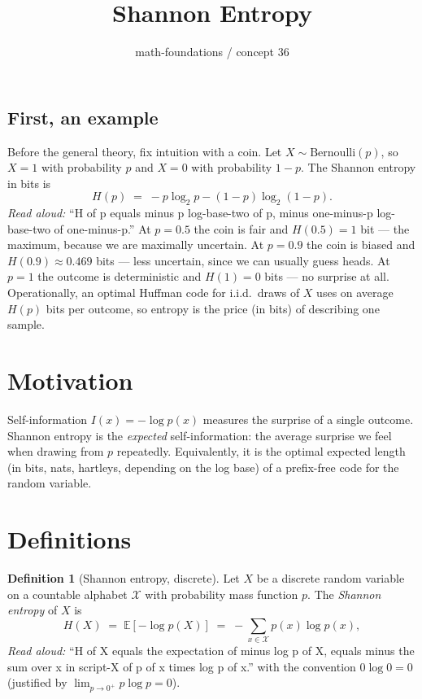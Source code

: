 \documentclass[11pt]{article}
\title{Shannon Entropy}
\author{math-foundations / concept 36}
\date{}
\theoremstyle{definition}
\newtheorem{definition}[theorem]{Definition}
\begin{document}
\maketitle

\subsection*{First, an example}
Before the general theory, fix intuition with a coin. Let $X \sim \mathrm{Bernoulli}(p)$,
so $X = 1$ with probability $p$ and $X = 0$ with probability $1-p$. The Shannon
entropy in bits is
\[
H(p) \;=\; -p \log_2 p - (1-p) \log_2 (1-p).
\]
\emph{Read aloud:} ``H of p equals minus p log-base-two of p, minus one-minus-p log-base-two of one-minus-p.''
At $p = 0.5$ the coin is fair and $H(0.5) = 1$ bit --- the maximum, because we are
maximally uncertain. At $p = 0.9$ the coin is biased and $H(0.9) \approx 0.469$ bits
--- less uncertain, since we can usually guess heads. At $p = 1$ the outcome is
deterministic and $H(1) = 0$ bits --- no surprise at all. Operationally, an optimal
Huffman code for i.i.d.\ draws of $X$ uses on average $H(p)$ bits per outcome, so
entropy is the price (in bits) of describing one sample.

\section{Motivation}
Self-information $I(x) = -\log p(x)$ measures the surprise of a single outcome.
Shannon entropy is the \emph{expected} self-information: the average surprise we feel
when drawing from $p$ repeatedly. Equivalently, it is the optimal expected length
(in bits, nats, hartleys, depending on the log base) of a prefix-free code for the
random variable.

\section{Definitions}

\begin{definition}[Shannon entropy, discrete]
Let $X$ be a discrete random variable on a countable alphabet $\mathcal{X}$ with
probability mass function $p$. The \emph{Shannon entropy} of $X$ is
\[
H(X) \;=\; \mathbb{E}\!\left[-\log p(X)\right] \;=\; -\sum_{x \in \mathcal{X}} p(x) \log p(x),
\]
\emph{Read aloud:} ``H of X equals the expectation of minus log p of X, equals minus the sum over x in script-X of p of x times log p of x.''
with the convention $0 \log 0 = 0$ (justified by
$\lim_{p \to 0^+} p \log p = 0$).
\end{definition}
\end{document}
